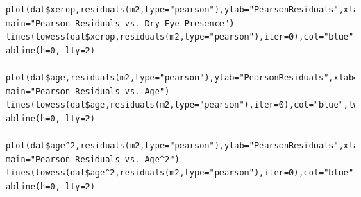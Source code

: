 \documentclass[11pt]{article}
\begin{document}
\begin{verbatim}
plot(dat$xerop,residuals(m2,type="pearson"),ylab="PearsonResiduals",xlab="xerop", main="Pearson Residuals vs. Dry Eye Presence")
lines(lowess(dat$xerop,residuals(m2,type="pearson"),iter=0),col="blue",lwd=2)
abline(h=0, lty=2)

plot(dat$age,residuals(m2,type="pearson"),ylab="PearsonResiduals",xlab="age", main="Pearson Residuals vs. Age")
lines(lowess(dat$age,residuals(m2,type="pearson"),iter=0),col="blue",lwd=2)
abline(h=0, lty=2)

plot(dat$age^2,residuals(m2,type="pearson"),ylab="PearsonResiduals",xlab="age", main="Pearson Residuals vs. Age^2")
lines(lowess(dat$age^2,residuals(m2,type="pearson"),iter=0),col="blue",lwd=2)
abline(h=0, lty=2)

\end{verbatim}
\end{document}
